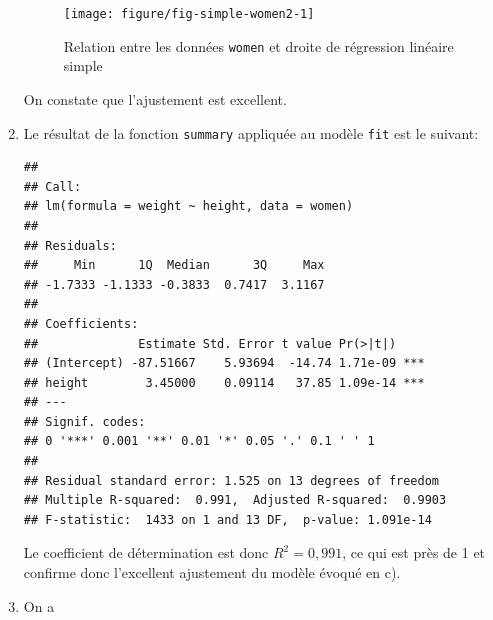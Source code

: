 \begin{solution}{2.3}
\begin{enumerate}
\begin{figure}
\begin{knitrout}
{\centering \texttt{[image: figure/fig-simple-women2-1]}

}



\end{knitrout}
        \caption{Relation entre les données \texttt{women} et droite de régression linéaire simple}
        \label{fig:simple:women2}
      \end{figure}
      On constate que l'ajustement est excellent.
    \item Le résultat de la fonction \texttt{summary} appliquée au
      modèle \texttt{fit} est le suivant:
\begin{knitrout}
\color{fgcolor}\begin{kframe}
\begin{alltt}
\end{alltt}
\begin{verbatim}
##
## Call:
## lm(formula = weight ~ height, data = women)
##
## Residuals:
##     Min      1Q  Median      3Q     Max
## -1.7333 -1.1333 -0.3833  0.7417  3.1167
##
## Coefficients:
##              Estimate Std. Error t value Pr(>|t|)
## (Intercept) -87.51667    5.93694  -14.74 1.71e-09 ***
## height        3.45000    0.09114   37.85 1.09e-14 ***
## ---
## Signif. codes:
## 0 '***' 0.001 '**' 0.01 '*' 0.05 '.' 0.1 ' ' 1
##
## Residual standard error: 1.525 on 13 degrees of freedom
## Multiple R-squared:  0.991,	Adjusted R-squared:  0.9903
## F-statistic:  1433 on 1 and 13 DF,  p-value: 1.091e-14
\end{verbatim}
\end{kframe}
\end{knitrout}
      Le coefficient de détermination est donc
      $R^2 = 0,991$, %
      ce qui est près de 1 et confirme donc l'excellent
      ajustement du modèle évoqué en c).
    \item On a
\begin{knitrout}
\color{fgcolor}\begin{kframe}
\begin{alltt}
 \hlkwb{<-}  \hlopt{-} \hlopt{^}\hlstd{)}
 \hlkwb{<-} \hlstd{((} \hlopt{-} \hlopt{^}\hlstd{)}
 \hlkwb{<-}  \hlopt{-} \hlopt{^}\hlstd{)}

\end{alltt}
\end{kframe}
\end{knitrout}
\end{enumerate}
\end{solution}
